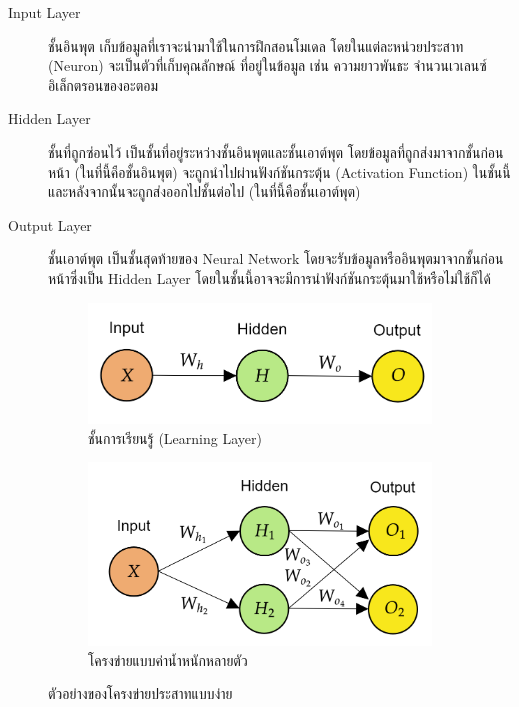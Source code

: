 \begin{description}
    \item[Input Layer] ชั้นอินพุต เก็บข้อมูลที่เราจะนำมาใช้ในการฝึกสอนโมเดล โดยในแต่ละหน่วยประสาท (Neuron) จะเป็นตัวที่เก็บคุณลักษณ์%
    ที่อยู่ในข้อมูล เช่น ความยาวพันธะ จำนวนเวเลนซ์อิเล็กตรอนของอะตอม
    
    \item[Hidden Layer] ชั้นที่ถูกซ่อนไว้ เป็นชั้นที่อยู่ระหว่างชั้นอินพุตและชั้นเอาต์พุต โดยข้อมูลที่ถูกส่งมาจากชั้นก่อนหน้า (ในที่นี้คือชั้นอินพุต)
    จะถูกนำไปผ่านฟังก์ชันกระตุ้น (Activation Function) ในชั้นนี้ และหลังจากนั้นจะถูกส่งออกไปชั้นต่อไป (ในที่นี้คือชั้นเอาต์พุต)
    
    \item[Output Layer] ชั้นเอาต์พุต เป็นชั้นสุดท้ายของ Neural Network โดยจะรับข้อมูลหรืออินพุตมาจากชั้นก่อนหน้าซึ่งเป็น Hidden Layer
    โดยในชั้นนี้อาจจะมีการนำฟังก์ชันกระตุ้นมาใช้หรือไม่ใช้ก็ได้
\end{description}

\begin{figure}[H]
    \centering
    \begin{subfigure}{0.5\textwidth}
        \centering
        \includegraphics[width=0.9\linewidth]{fig/nn_layer.png}
        \caption{ชั้นการเรียนรู้ (Learning Layer)}
        \label{fig:nn_layer}
    \end{subfigure}%
    \begin{subfigure}{0.5\textwidth}
        \centering
        \includegraphics[width=0.9\linewidth]{fig/nn_w_matrices.png}
        \caption{โครงข่ายแบบค่าน้ำหนักหลายตัว}
        \label{fig:nn_w_matrices}
    \end{subfigure}
    \caption{ตัวอย่างของโครงข่ายประสาทแบบง่าย}
    \label{fig:nn_layer_w}
\end{figure}

